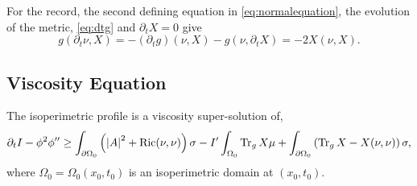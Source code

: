 \documentclass{amsart}
\begin{document}
\begin{rem}
For the record, the second defining equation in \eqref{eq:normalequation}, the evolution of the metric, \eqref{eq:dtg} and \(\partial_t X = 0\) give
\[
g(\partial_t \nu, X) = -(\partial_t g) (\nu, X) - g(\nu, \partial_t X) = -2 X(\nu, X).
\]
\end{rem}

\subsection{Viscosity Equation}
\label{subsec:iso_diff_ineq_viscosity}

\begin{thm}
The isoperimetric profile is a viscosity super-solution of,
\[
\partial_t I - \phi^2 \phi'' \geq  \int_{\partial {\Omega_0}} \left(\left|{A}\right|^2 + \operatorname{Ric}(\nu, \nu)\right) \sigma  - I'\int_{\Omega_0} \operatorname{Tr}_g X \mu + \int_{\partial {\Omega_0}} \left(\operatorname{Tr}_g X - X(\nu, \nu)\right) \sigma,
\]
where \(\Omega_0 = \Omega_0(x_0, t_0)\) is an isoperimetric domain at \((x_0, t_0)\).
\end{thm}
\end{document}
